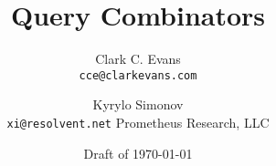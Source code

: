 \documentclass[10pt,twocolumn,article]{memoir}
\newcommand{\email}[1]{\normalsize{\texttt{#1}}}
\begin{document}
\title{Query Combinators}
\author{
    Clark C. Evans \\ \email{cce@clarkevans.com} \and
    Kyrylo Simonov \\ \email{xi@resolvent.net} \andnext
    Prometheus Research, LLC}
\date{Draft of \today}

\maketitle












\end{document}

